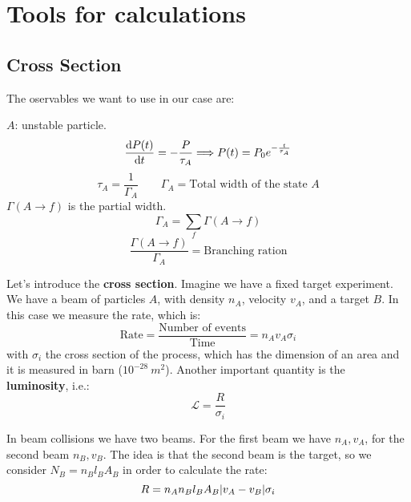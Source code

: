 \documentclass[../../main/main.tex]{subfiles}
\begin{document}
\chapter{Tools for calculations}

\section{Cross Section}
The oservables we want to use in our case are:

\( A \): unstable particle.\\
\begin{equation}
    \dv{P(t)}{t} = - \frac{P}{\tau_A}
    \Longrightarrow
    P(t) = P_0 e^{-\frac{t}{\tau_A}}
    \label{eq:}
\end{equation}
\begin{equation}
    \tau_A = \frac{1}{\Gamma_A}
    \qquad
    \Gamma_A = \text{Total width of the state } A
    \label{eq:}
\end{equation}
\( \Gamma(A\longrightarrow f) \) is the partial width.
\begin{equation}
    \Gamma_A = \sum_{f} \Gamma(A \longrightarrow f)
    \label{eq:}
\end{equation}
\begin{equation}
    \frac{\Gamma(A \longrightarrow f)}{\Gamma_A}
    =
    \text{Branching ration}
    \label{eq:}
\end{equation}

Let's introduce the \textbf{cross section}. Imagine we have a fixed target experiment. We have a beam of particles \( A \), with density \( n_A \), velocity \( v_A \), and a target \( B \). In this case we measure the rate, which is:
\begin{equation}
    \text{Rate}
    =
    \frac{\text{Number of events}}{\text{Time}}
    =
    n_A v_A \sigma_i
    \label{eq:}
\end{equation}
with \( \sigma_i \) the cross section of the process, which has the dimension of an area and it is measured in barn (\(10^{-28} \ \si{m^2} \)). Another important quantity is the \textbf{luminosity}, i.e.:
\begin{equation}
    \mathcal{L} = \frac{R}{\sigma_i}
    \label{eq:}
\end{equation}

In beam collisions we have two beams. For the first beam we have \( n_A, v_A \), for the second beam \( n_B, v_B \). The idea is that the second beam is the target, so we consider \( N_B = n_B l_B A_B \) in order to calculate the rate:
\begin{equation}
    R = n_A n_B l_B A_B \abs{v_A - v_B} \sigma_i
    \label{eq:}
\end{equation}
\end{document}
